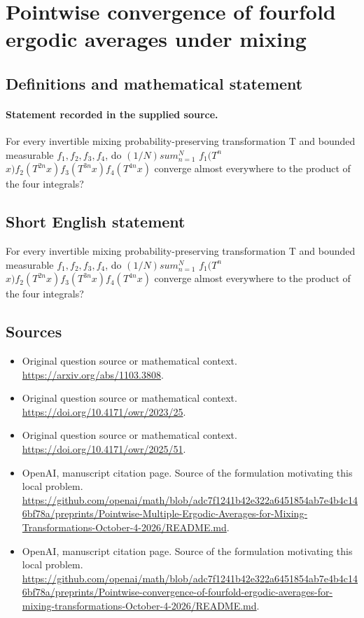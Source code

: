 \documentclass[11pt]{article}
\begin{document}
\section*{Pointwise convergence of fourfold ergodic averages under mixing}\label{statement}
\subsection{Definitions and mathematical statement}
\paragraph{Statement recorded in the supplied source.}
For every invertible mixing probability-preserving transformation T and bounded measurable $f_1,f_2,f_3,f_4$, do $(1/N)sum_{n=1}^N$ $f_1(T^n$ $x)f_2(T^{2n}x)f_3(T^{3n}x)f_4(T^{4n}x)$ converge almost everywhere to the product of the four integrals?
\subsection{Short English statement}
For every invertible mixing probability-preserving transformation T and bounded measurable $f_1,f_2,f_3,f_4$, do $(1/N)sum_{n=1}^N$ $f_1(T^n$ $x)f_2(T^{2n}x)f_3(T^{3n}x)f_4(T^{4n}x)$ converge almost everywhere to the product of the four integrals?
\subsection{Sources}
\begin{itemize}
\item[S1] Original question source or mathematical context.
\url{https://arxiv.org/abs/1103.3808}.
\item[S2] Original question source or mathematical context.
\url{https://doi.org/10.4171/owr/2023/25}.
\item[S3] Original question source or mathematical context.
\url{https://doi.org/10.4171/owr/2025/51}.
\item[S4] OpenAI, manuscript citation page. Source of the formulation motivating this local problem.
\url{https://github.com/openai/math/blob/adc7f1241b42e322a6451854ab7e4b4c146bf78a/preprints/Pointwise-Multiple-Ergodic-Averages-for-Mixing-Transformations-October-4-2026/README.md}.
\item[S5] OpenAI, manuscript citation page. Source of the formulation motivating this local problem.
\url{https://github.com/openai/math/blob/adc7f1241b42e322a6451854ab7e4b4c146bf78a/preprints/Pointwise-convergence-of-fourfold-ergodic-averages-for-mixing-transformations-October-4-2026/README.md}.
\end{itemize}
\end{document}
